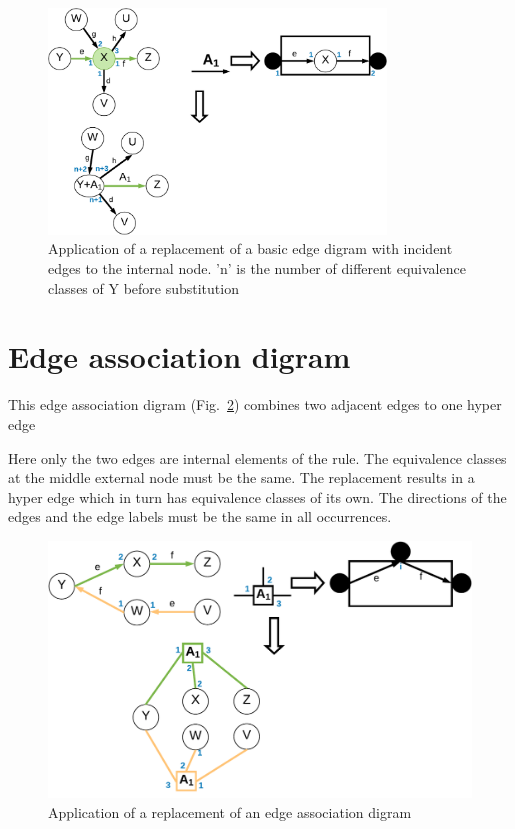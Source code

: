 \documentclass[a4paper]{scrartcl}
\begin{document}
\begin{figure}[h]
	\centering
	\includegraphics[width=0.8\textwidth]{img/edgeDigram_extern}
	\caption{Application of a replacement of a basic edge digram with incident edges to the internal node. 'n' is the number of different equivalence classes of Y before substitution}
	\label{fig:incedentEdges2}
\end{figure}

\section{Edge association digram}
\label{sec:edgeAssociationDigram}


This edge association digram (Fig.~\ref{fig:edgeAssociationDigram}) combines two adjacent edges to one hyper edge

Here only the two edges are internal elements of the rule. The equivalence classes at the middle external node must be the same. The replacement results in a hyper edge which in turn has equivalence classes of its own. The directions of the edges and the edge labels must be the same in all occurrences.
\begin{figure}[h]
	\centering
	\includegraphics[width=1\textwidth]{img/edgeAssociationDigram}
	\caption{Application of a replacement of an edge association digram}
	\label{fig:edgeAssociationDigram}
\end{figure}
\end{document}
